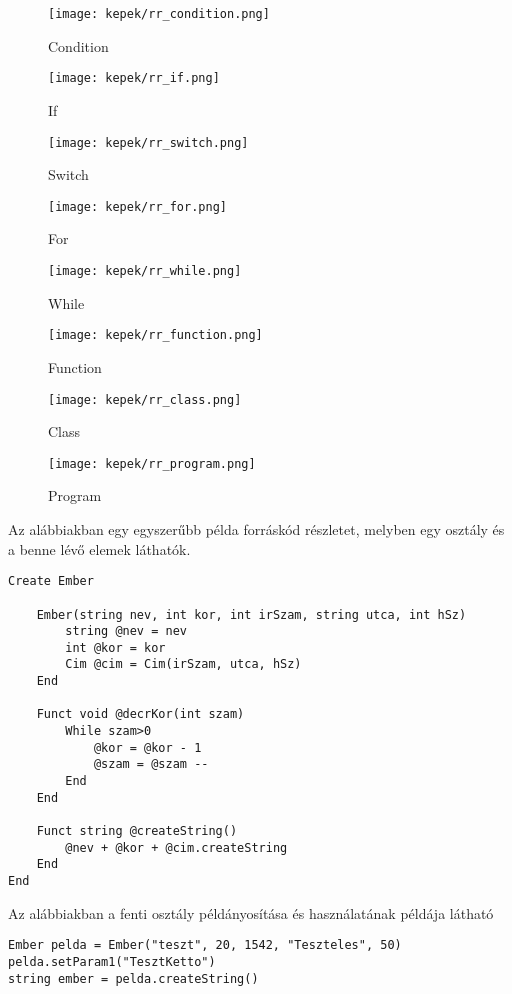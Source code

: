 \begin{figure}[h!]
\centering
\texttt{[image: kepek/rr\_condition.png]}
\caption{Condition}
\label{fig:rr_condition}
\end{figure}

\begin{figure}[h!]
\centering
\texttt{[image: kepek/rr\_if.png]}
\caption{If}
\label{fig:rr_if}
\end{figure}

\begin{figure}[h!]
\centering
\texttt{[image: kepek/rr\_switch.png]}
\caption{Switch}
\label{fig:rr_switch}
\end{figure}

\begin{figure}[h!]
\centering
\texttt{[image: kepek/rr\_for.png]}
\caption{For}
\label{fig:rr_for}
\end{figure}

\begin{figure}[h!]
\centering
\texttt{[image: kepek/rr\_while.png]}
\caption{While}
\label{fig:rr_while}
\end{figure}

\begin{figure}[h!]
\centering
\texttt{[image: kepek/rr\_function.png]}
\caption{Function}
\label{fig:rr_function}
\end{figure}

\begin{figure}[h!]
\centering
\texttt{[image: kepek/rr\_class.png]}
\caption{Class}
\label{fig:rr_class}
\end{figure}

\begin{figure}[h!]
\centering
\texttt{[image: kepek/rr\_program.png]}
\caption{Program}
\label{fig:rr_program}
\end{figure}


Az alábbiakban egy egyszerűbb példa forráskód részletet, melyben egy osztály és a benne lévő elemek láthatók.

\begin{verbatim}
Create Ember
	
	Ember(string nev, int kor, int irSzam, string utca, int hSz)
		string @nev = nev
		int @kor = kor
		Cim @cim = Cim(irSzam, utca, hSz)
	End
		
	Funct void @decrKor(int szam)
		While szam>0
			@kor = @kor - 1
			@szam = @szam --
		End
	End
	
	Funct string @createString()
		@nev + @kor + @cim.createString
	End
End
\end{verbatim}
		
Az alábbiakban a fenti osztály példányosítása és használatának példája látható

\begin{verbatim}
Ember pelda = Ember("teszt", 20, 1542, "Teszteles", 50)
pelda.setParam1("TesztKetto")
string ember = pelda.createString()
\end{verbatim}

